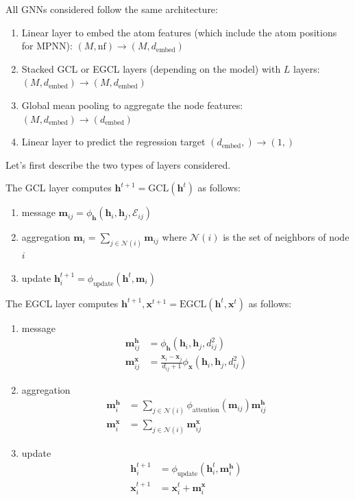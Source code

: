 \documentclass[sigconf]{acmart}
\begin{document}
All GNNs considered follow the same architecture:
\begin{enumerate}
    \item Linear layer to embed the atom features (which include the atom positions for MPNN): $(M,\text{nf}) \rightarrow (M, d_\text{embed})$
    \item Stacked GCL or EGCL layers (depending on the model) with $L$ layers: $(M, d_\text{embed}) \rightarrow (M, d_\text{embed})$
    \item Global mean pooling to aggregate the node features: $(M, d_\text{embed}) \rightarrow (d_\text{embed})$
    \item Linear layer to predict the regression target $(d_\text{embed},) \rightarrow (1,)$
\end{enumerate}

Let's first describe the two types of layers considered.

The GCL layer computes $\mathbf{h}^{t+1} = \text{GCL}(\mathbf{h}^t)$ as follows:
\begin{enumerate}
    \item message $\mathbf{m}_{ij} = \phi_\mathbf{h}(\mathbf{h}_i, \mathbf{h}_j, \mathcal{E}_{ij})$
    \item aggregation $\mathbf{m}_i = \sum_{j\in\mathcal{N}(i)} \mathbf{m}_{ij}$ where $\mathcal{N}(i)$ is the set of neighbors of node $i$
    \item update $\mathbf{h}_i^{t+1} = \phi_\text{update}(\mathbf{h}^t, \mathbf{m}_i)$
\end{enumerate}

The EGCL layer computes $\mathbf{h}^{t+1}, \mathbf{x}^{t+1} = \text{EGCL}(\mathbf{h}^t, \mathbf{x}^t)$ as follows:
\begin{enumerate}
    \item message
    \begin{align*}
      \mathbf{m}_{ij}^\mathbf{h} &= \phi_\mathbf{h}(\mathbf{h}_i, \mathbf{h}_j, d_{ij}^2) \\
      \mathbf{m}_{ij}^\mathbf{x}& = \frac{\mathbf{x}_i - \mathbf{x}_j}{d_{ij}+1} \phi_\mathbf{x}(\mathbf{h}_i, \mathbf{h}_j, d_{ij}^2)
    \end{align*}
    \item aggregation
    \begin{align*}
      \mathbf{m}_i^\mathbf{h} &= \sum_{j\in\mathcal{N}(i)} \phi_\text{attention}(\mathbf{m}_{ij}) \mathbf{m}_{ij}^\mathbf{h} \\
      \mathbf{m}_i^\mathbf{x} &= \sum_{j\in\mathcal{N}(i)} \mathbf{m}_{ij}^\mathbf{x}
    \end{align*}
    \item update
    \begin{align*}
      \mathbf{h}_i^{t+1} &= \phi_\text{update}(\mathbf{h}_i^t, \mathbf{m}_i^\mathbf{h}) \\
      \mathbf{x}_i^{t+1} &= \mathbf{x}_i^t + \mathbf{m}_i^\mathbf{x}
    \end{align*}
\end{enumerate}
\end{document}
